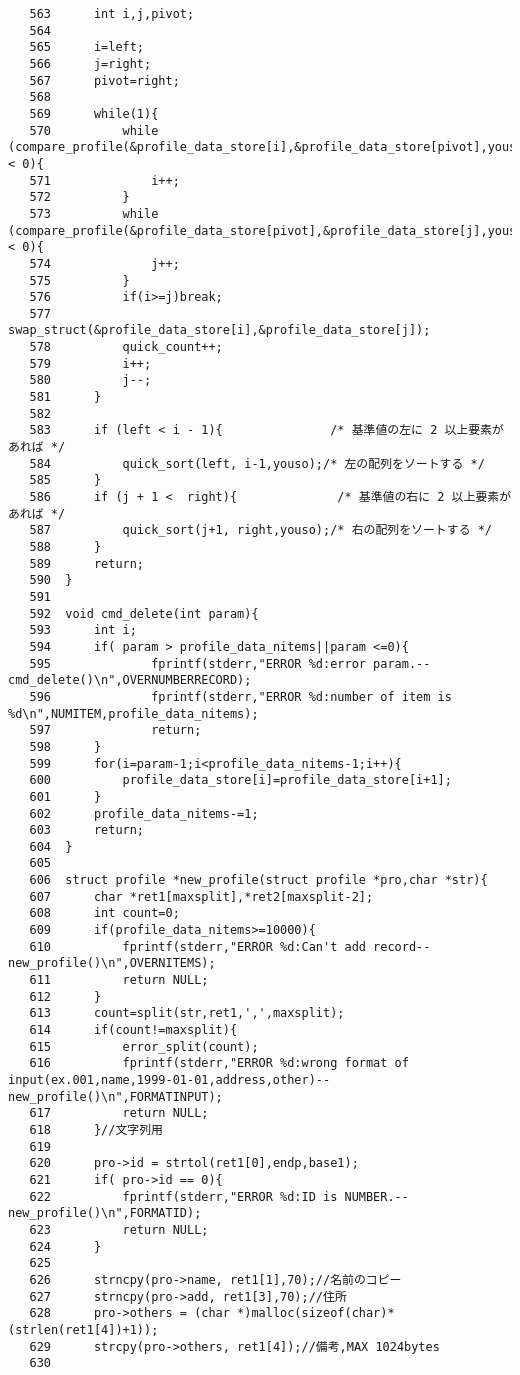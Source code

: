 \documentclass[a4j,11pt]{jarticle}
\begin{document}
{\begin{verbatim}
   563	    int i,j,pivot;
   564	    
   565	    i=left; 
   566	    j=right;
   567	    pivot=right;
   568	    
   569	    while(1){
   570	        while (compare_profile(&profile_data_store[i],&profile_data_store[pivot],youso) < 0){
   571	            i++;
   572	        }
   573	        while (compare_profile(&profile_data_store[pivot],&profile_data_store[j],youso) < 0){
   574	            j++;
   575	        }
   576	        if(i>=j)break;
   577	        swap_struct(&profile_data_store[i],&profile_data_store[j]);
   578	        quick_count++;
   579	        i++;
   580	        j--;
   581	    }
   582	    
   583	    if (left < i - 1){               /* 基準値の左に 2 以上要素があれば */
   584	        quick_sort(left, i-1,youso);/* 左の配列をソートする */
   585	    }
   586	    if (j + 1 <  right){              /* 基準値の右に 2 以上要素があれば */
   587	        quick_sort(j+1, right,youso);/* 右の配列をソートする */
   588	    }
   589	    return;
   590	}
   591	
   592	void cmd_delete(int param){
   593	    int i;
   594	    if( param > profile_data_nitems||param <=0){
   595	            fprintf(stderr,"ERROR %d:error param.--cmd_delete()\n",OVERNUMBERRECORD);
   596	            fprintf(stderr,"ERROR %d:number of item is %d\n",NUMITEM,profile_data_nitems);
   597	            return;
   598	    }
   599	    for(i=param-1;i<profile_data_nitems-1;i++){
   600	        profile_data_store[i]=profile_data_store[i+1];
   601	    }
   602	    profile_data_nitems-=1;
   603	    return;
   604	}
   605	
   606	struct profile *new_profile(struct profile *pro,char *str){
   607	    char *ret1[maxsplit],*ret2[maxsplit-2];
   608	    int count=0;
   609	    if(profile_data_nitems>=10000){
   610	        fprintf(stderr,"ERROR %d:Can't add record--new_profile()\n",OVERNITEMS);
   611	        return NULL;
   612	    }
   613	    count=split(str,ret1,',',maxsplit);
   614	    if(count!=maxsplit){
   615	        error_split(count);
   616	        fprintf(stderr,"ERROR %d:wrong format of input(ex.001,name,1999-01-01,address,other)--new_profile()\n",FORMATINPUT);
   617	        return NULL;
   618	    }//文字列用
   619	
   620	    pro->id = strtol(ret1[0],endp,base1);
   621	    if( pro->id == 0){
   622	        fprintf(stderr,"ERROR %d:ID is NUMBER.--new_profile()\n",FORMATID);
   623	        return NULL;
   624	    }
   625	
   626	    strncpy(pro->name, ret1[1],70);//名前のコピー
   627	    strncpy(pro->add, ret1[3],70);//住所
   628	    pro->others = (char *)malloc(sizeof(char)*(strlen(ret1[4])+1));
   629	    strcpy(pro->others, ret1[4]);//備考,MAX 1024bytes
   630	

\end{verbatim}}
\end{document}
